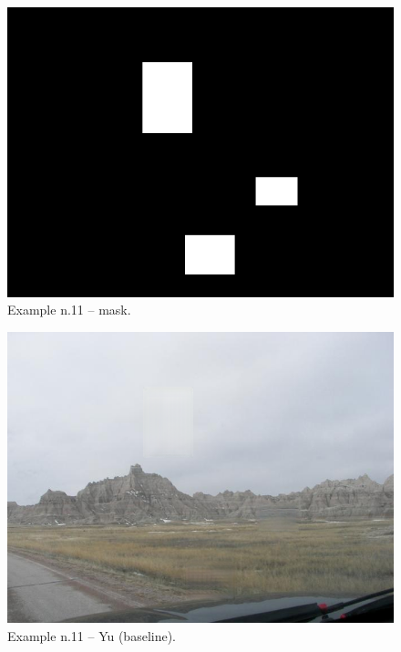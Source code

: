 \documentclass[a4paper, 11pt]{article}
\begin{document}
\begin{figure}
    \centering
    \includegraphics[width=.95\linewidth]{documentation/img/masks/0185_mask.png}
    \caption{Example n.11 -- mask.}
    \label{img:ex_n.11_mask}
\end{figure}
\begin{figure}
    \centering
    \includegraphics[width=.95\linewidth]{documentation/img/baseline/0185.png}
    \caption{Example n.11 -- Yu (baseline).}
    \label{img:ex_n.11_mask}
\end{figure}
\end{document}
